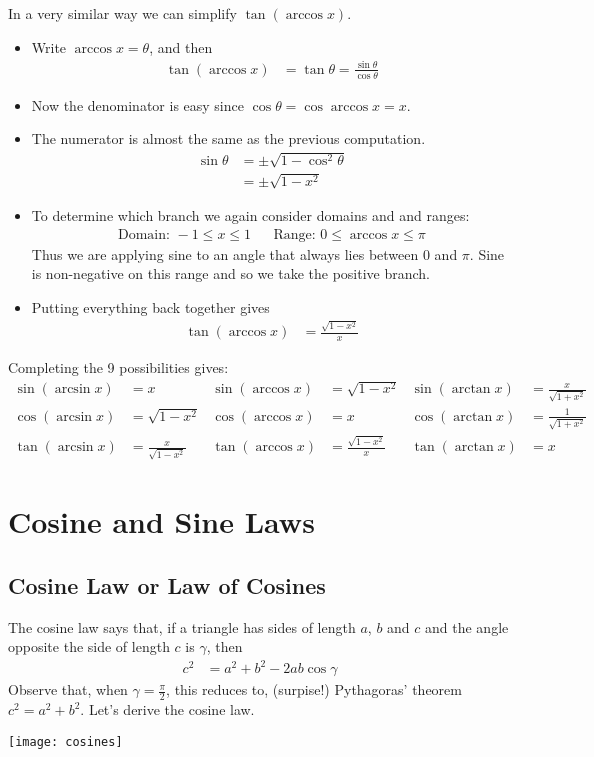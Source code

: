 In a very similar way we can simplify $\tan(\arccos x)$.
\begin{itemize}
\item Write $\arccos x=\theta$, and then
\begin{align*}
  \tan( \arccos x) &= \tan \theta = \frac{\sin\theta}{\cos \theta}
\end{align*}
\item Now the denominator is easy since $\cos \theta = \cos \arccos x = x$.
\item The numerator is almost the same as the previous computation.
\begin{align*}
  \sin\theta &= \pm \sqrt{1-\cos^2\theta} \\
  &= \pm \sqrt{1-x^2}
\end{align*}
 \item To determine which branch we again consider domains and
and ranges:
\begin{align*}
  \text{Domain: } -1 \leq x \leq 1 && \text{Range: } 0 \leq \arccos
x \leq \pi
\end{align*}
  Thus we are applying sine to an angle that always lies between
$0$ and $\pi$. Sine is non-negative on this range and so we take the positive
branch.
\item Putting everything back together gives
\begin{align*}
  \tan(\arccos x) &= \frac{\sqrt{1-x^2}}{x}
\end{align*}

\end{itemize}


Completing the 9 possibilities gives:
\begin{align*}
  \sin( \arcsin x ) &= x &
  \sin( \arccos x ) &= \sqrt{1-x^2} &
  \sin( \arctan x ) &= \frac{x}{\sqrt{1+x^2}} \\
%
  \cos( \arcsin x ) &= \sqrt{1-x^2} &
  \cos( \arccos x ) &= x &
  \cos( \arctan x ) &= \frac{1}{\sqrt{1+x^2}} \\
%
  \tan( \arcsin x ) &= \frac{x}{\sqrt{1-x^2}} &
  \tan( \arccos x ) &= \frac{\sqrt{1-x^2}}{x} &
  \tan( \arctan x ) &= x
\end{align*}


\section{Cosine and Sine Laws}\label{sec_B_4}
\subsection{Cosine Law or Law of Cosines}\label{app cosine law}
The cosine law says that, if a triangle has sides of length $a$, $b$ and $c$ and
the angle opposite the side of length $c$ is $\gamma$, then
\begin{align*}
  c^2 &= a^2+b^2 - 2ab\cos\gamma
\end{align*}
Observe that, when $\gamma=\tfrac{\pi}{2}$, this reduces to, (surpise!)
Pythagoras' theorem $c^2=a^2+b^2$. Let's derive the cosine law.
\begin{center}
 \texttt{[image: cosines]}
\end{center}

